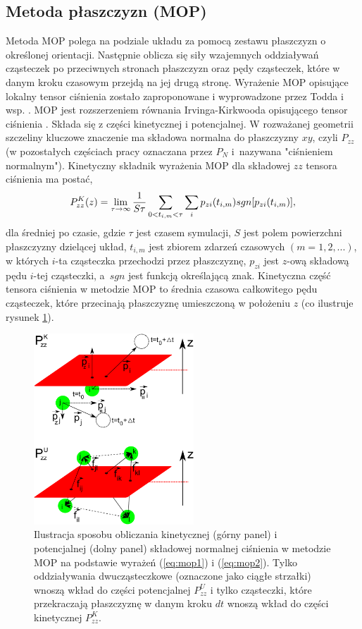 \documentclass[12pt,a4paper,openright]{report} %
\begin{document}
\subsection{Metoda płaszczyzn (MOP)}
\label{mop_omowienie}
Metoda MOP polega na podziale układu za pomocą zestawu płaszczyzn o określonej orientacji. Następnie oblicza się siły wzajemnych oddziaływań cząsteczek po przeciwnych stronach płaszczyzn oraz pędy cząsteczek, które w danym kroku czasowym przejdą na jej drugą stronę.
%
%
Wyrażenie MOP opisujące lokalny tensor ciśnienia zostało zaproponowane i wyprowadzone przez Todda i wsp. \cite{Todd}. MOP jest rozszerzeniem równania Irvinga-Kirkwooda opisującego tensor ciśnienia \cite{Todd, IK1950}. Składa się z części kinetycznej i potencjalnej. W rozważanej geometrii szczeliny kluczowe znaczenie ma składowa normalna do płaszczyzny $xy$, czyli $P_{zz}$ (w pozostałych częściach pracy oznaczana przez $P_N$ i~nazywana "ciśnieniem normalnym"). Kinetyczny składnik wyrażenia MOP dla składowej $zz$ tensora ciśnienia ma postać,
\begin{equation}
P_{zz}^{K}(z)=\lim_{\tau \to \infty} {1 \over{S \tau}} \sum_{0<t_{i,m}<\tau} \sum_{i} { p_{zi}(t_{i,m})sgn[p_{zi}(t_{i,m})]},
\label{eq:mop1}
\end{equation}
%
dla średniej po czasie, gdzie $\tau$ jest czasem symulacji, $S$ jest polem powierzchni płaszczyzny dzielącej układ, $t_{i, m}$ jest zbiorem zdarzeń czasowych $(m = 1,2, ... )$, w których $i$-ta cząsteczka przechodzi przez płaszczyznę, $p_{zi}$ jest $z$-ową składową pędu $i$-tej cząsteczki, a~$sgn$ jest funkcją określającą znak.
%
Kinetyczna część tensora ciśnienia w metodzie MOP to średnia czasowa całkowitego pędu cząsteczek, które przecinają płaszczyznę umieszczoną w położeniu $z$ (co ilustruje rysunek \ref{cmst2}).
\begin{figure}[h]
\centering
\includegraphics[width=60mm]{rysunki/cmst2.pdf}
\caption{Ilustracja sposobu obliczania kinetycznej (górny panel) i potencjalnej (dolny panel) składowej normalnej ciśnienia w metodzie MOP na podstawie wyrażeń (\ref{eq:mop1}) i (\ref{eq:mop2}).  Tylko oddziaływania dwucząsteczkowe (oznaczone jako ciągłe strzałki) wnoszą wkład do części potencjalnej $P_{zz}^{U}$ i tylko cząsteczki, które przekraczają płaszczyznę w danym kroku $dt$ wnoszą wkład do części kinetycznej $P_{zz}^{K}$.}
\label{cmst2}
\end{figure}
\end{document}
